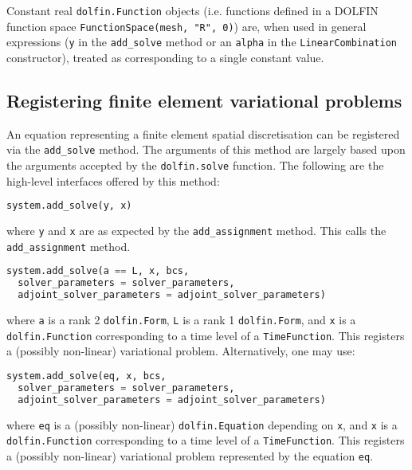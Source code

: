 \documentclass[a4paper]{book}
\begin{document}
Constant real \verb+dolfin.Function+ objects (i.e. functions defined in a
DOLFIN function space \verb+FunctionSpace(mesh, "R", 0)+) are, when used in
general expressions (\verb+y+ in the \verb+add_solve+ method or an \verb+alpha+
in the \verb+LinearCombination+ constructor), treated as corresponding to a
single constant value.

\subsection{Registering finite element variational problems}

An equation representing a finite element spatial discretisation can be
registered via the \verb+add_solve+ method. The arguments of this method are
largely based upon the arguments accepted by the \verb+dolfin.solve+ function.
The following are the high-level interfaces offered by this method:

\begin{lstlisting}[language = python, frame = single, basicstyle=\footnotesize]
system.add_solve(y, x)
\end{lstlisting}
where \verb+y+ and \verb+x+ are as expected by the \verb+add_assignment+ method.
This calls the \verb+add_assignment+ method.

\begin{lstlisting}[language = python, frame = single, basicstyle=\footnotesize]
system.add_solve(a == L, x, bcs,
  solver_parameters = solver_parameters,
  adjoint_solver_parameters = adjoint_solver_parameters)
\end{lstlisting}
where \verb+a+ is a rank 2 \verb+dolfin.Form+, \verb+L+ is a rank 1 \linebreak
\verb+dolfin.Form+, and \verb+x+ is a \verb+dolfin.Function+ corresponding to a
time level of a \linebreak \verb+TimeFunction+. This registers a (possibly
non-linear) variational problem. Alternatively, one may use:
\begin{lstlisting}[language = python, frame = single, basicstyle=\footnotesize]
system.add_solve(eq, x, bcs,
  solver_parameters = solver_parameters,
  adjoint_solver_parameters = adjoint_solver_parameters)
\end{lstlisting}
where \verb+eq+ is a (possibly non-linear) \verb+dolfin.Equation+ depending on
\verb+x+, and \verb+x+ is a \verb+dolfin.Function+ corresponding to a time level
of a \verb+TimeFunction+. This registers a (possibly non-linear) variational
problem represented by the equation \verb+eq+.
\end{document}
